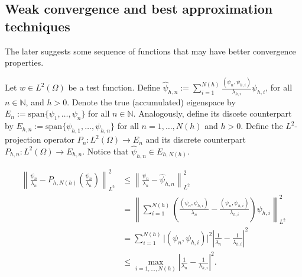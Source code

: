 \subsection{Weak convergence and best approximation techniques}

The later suggests some sequence of functions that may have better convergence properties.

Let \(w \in L^2(\Omega)\) be a test function.
Define \(\hat \psi_{h, n} := \sum_{i=1}^{N(h)} \frac{(\psi_n, \psi_{h, i})}{\lambda_{h, i}} \psi_{h, i}\), for all \(n \in \mathbb{N}\), and \(h > 0\).
Denote the true (accumulated) eigenspace by \( E_n := \text{span}\{\psi_1, \ldots, \psi_n\}\) for all \(n \in \mathbb{N}\).
Analogously, define its discete counterpart by \(E_{h, n} := \text{span}\{\psi_{h, 1}, \ldots, \psi_{h, n}\}\) for all \(n = 1, \dots, N(h)\) and \(h > 0\).
Define the \(L^2\)-projection operator \(P_n: L^2(\Omega) \to E_n\) and its discrete counterpart \(P_{h, n}: L^2(\Omega) \to E_{h, n}\).
Notice that \(\hat \psi_{h, n} \in E_{h, N(h)}\).

\begin{align*}
    \left\lVert \frac{\psi_n}{\lambda_n} - P_{h, N(h)}\left( \frac{\psi_n}{\lambda_n} \right) \right\rVert_{L^2}^2
    & \leq \left\lVert \frac{\psi_n}{\lambda_n} - \hat \psi_{h, n} \right\rVert_{L^2}^2 \\
    & = \left\lVert \sum_{i=1}^{N(h)} \left( \frac{(\psi_n, \psi_{h, i})}{\lambda_n} - \frac{(\psi_n, \psi_{h, i})}{\lambda_{h, i}} \right) \psi_{h, i} \right\rVert_{L^2}^2 \\
    & = \sum_{i=1}^{N(h)} \lvert (\psi_n, \psi_{h, i}) \rvert^2 \left\lvert \frac{1}{\lambda_n} - \frac{1}{\lambda_{h, i}} \right\rvert^2 \\
    & \leq \max_{i=1, \dots, N(h)} \left\lvert \frac{1}{\lambda_n} - \frac{1}{\lambda_{h, i}} \right\rvert^2.
\end{align*}


